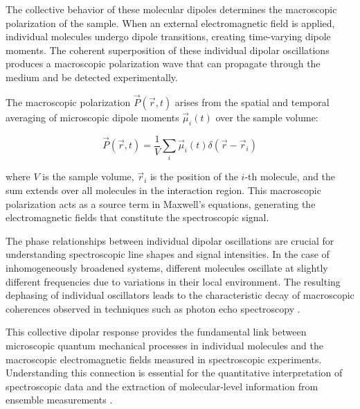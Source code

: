 \noindent The collective behavior of these molecular dipoles determines the macroscopic polarization of the sample. When an external electromagnetic field is applied, individual molecules undergo dipole transitions, creating time-varying dipole moments. The coherent superposition of these individual dipolar oscillations produces a macroscopic polarization wave that can propagate through the medium and be detected experimentally.

\noindent The macroscopic polarization $\vec{P}(\vec{r}, t)$ arises from the spatial and temporal averaging of microscopic dipole moments $\vec{\mu}_i(t)$ over the sample volume:

\begin{equation}
	\vec{P}(\vec{r}, t) = \frac{1}{V} \sum_{i} \vec{\mu}_i(t) \delta(\vec{r} - \vec{r}_i)
	\label{eq:macroscopic_polarization}
\end{equation}

\noindent where $V$ is the sample volume, $\vec{r}_i$ is the position of the $i$-th molecule, and the sum extends over all molecules in the interaction region. This macroscopic polarization acts as a source term in Maxwell's equations, generating the electromagnetic fields that constitute the spectroscopic signal.

\noindent The phase relationships between individual dipolar oscillations are crucial for understanding spectroscopic line shapes and signal intensities. In the case of inhomogeneously broadened systems, different molecules oscillate at slightly different frequencies due to variations in their local environment. The resulting dephasing of individual oscillators leads to the characteristic decay of macroscopic coherences observed in techniques such as photon echo spectroscopy \cite{mukamel1995principlesnonlinearoptical}.

\noindent This collective dipolar response provides the fundamental link between microscopic quantum mechanical processes in individual molecules and the macroscopic electromagnetic fields measured in spectroscopic experiments. Understanding this connection is essential for the quantitative interpretation of spectroscopic data and the extraction of molecular-level information from ensemble measurements \cite{feynman1965feynmanlecturesphysics}.


